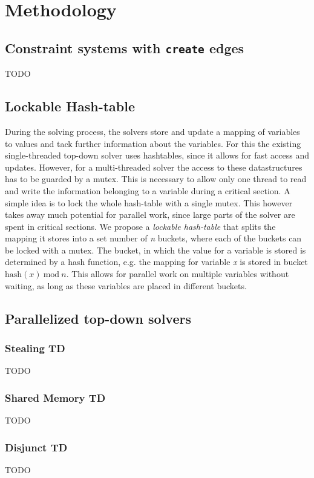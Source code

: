 \section{Methodology}
\label{sec:method}

  \subsection{Constraint systems with \texttt{create} edges}
  \label{sec:method:create}
  TODO

  \subsection{Lockable Hash-table}
  \label{sec:method:LHM}
  During the solving process, the solvers store and update a mapping of variables to values and tack further information about the variables. For this the existing single-threaded top-down solver uses hashtables, since it allows for fast access and updates. However, for a multi-threaded solver the access to these datastructures has to be guarded by a mutex. This is necessary to allow only one thread to read and write the information belonging to a variable during a critical section. 
  A simple idea is to lock the whole hash-table with a single mutex. This however takes away much potential for parallel work, since large parts of the solver are spent in critical sections.
  We propose a \textit{lockable hash-table} that splits the mapping it stores into a set number of \textit{n} buckets, where each of the buckets can be locked with a mutex. The bucket, in which the value for a variable is stored is determined by a hash function, e.g. the mapping for variable \textit{x} is stored in bucket $\text{hash}(x)\ \text{mod}\ n$. This allows for parallel work on multiple variables without waiting, as long as these variables are placed in different buckets.

  \subsection{Parallelized top-down solvers}
  \label{sec:method:td_parallel}

    \subsubsection{Stealing TD}
    \label{sec:method:td_parallel:stealing}
    TODO

    \subsubsection{Shared Memory TD}
    \label{sec:method:td_parallel:sharedMem}
    TODO

    \subsubsection{Disjunct TD}
    \label{sec:method:td_parallel:disjunct}
    TODO
